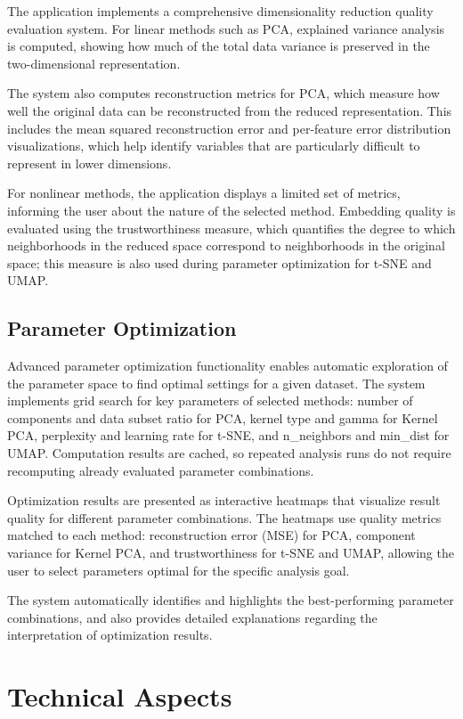 \documentclass[a4paper, 12pt]{article}
\begin{document}
The application implements a comprehensive dimensionality reduction quality evaluation system. For linear methods such as PCA, explained variance analysis is computed, showing how much of the total data variance is preserved in the two-dimensional representation.

The system also computes reconstruction metrics for PCA, which measure how well the original data can be reconstructed from the reduced representation. This includes the mean squared reconstruction error and per-feature error distribution visualizations, which help identify variables that are particularly difficult to represent in lower dimensions.

For nonlinear methods, the application displays a limited set of metrics, informing the user about the nature of the selected method. Embedding quality is evaluated using the trustworthiness measure, which quantifies the degree to which neighborhoods in the reduced space correspond to neighborhoods in the original space; this measure is also used during parameter optimization for t-SNE and UMAP.

\subsection{Parameter Optimization}

Advanced parameter optimization functionality enables automatic exploration of the parameter space to find optimal settings for a given dataset. The system implements grid search for key parameters of selected methods: number of components and data subset ratio for PCA, kernel type and gamma for Kernel PCA, perplexity and learning rate for t-SNE, and n\_neighbors and min\_dist for UMAP. Computation results are cached, so repeated analysis runs do not require recomputing already evaluated parameter combinations.

Optimization results are presented as interactive heatmaps that visualize result quality for different parameter combinations. The heatmaps use quality metrics matched to each method: reconstruction error (MSE) for PCA, component variance for Kernel PCA, and trustworthiness for t-SNE and UMAP, allowing the user to select parameters optimal for the specific analysis goal.

The system automatically identifies and highlights the best-performing parameter combinations, and also provides detailed explanations regarding the interpretation of optimization results.

\section{Technical Aspects}
\end{document}

